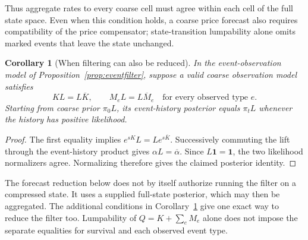 \documentclass[11pt]{article}
\theoremstyle{plain}
\newtheorem{corollary}[theorem]{Corollary}
\theoremstyle{definition}
\theoremstyle{remark}
\begin{document}
Thus aggregate rates to every coarse cell must agree within each
cell of the full state space. Even when this condition holds, a
coarse price forecast also requires compatibility of the price
compensator; state-transition lumpability alone omits marked events
that leave the state unchanged.

\begin{corollary}[When filtering can also be reduced]
\label{cor:filterreduction}
In the event-observation model of Proposition~\ref{prop:eventfilter},
suppose a valid coarse observation model satisfies
\[
 KL=L\overline K,\qquad M_eL=L\overline M_e
 \quad\text{for every observed type }e.
\]
Starting from coarse prior \(\pi_0L\), its event-history posterior
equals \(\pi_tL\) whenever the history has positive likelihood.
\end{corollary}
\begin{proof}
The first equality implies \(e^{sK}L=Le^{s\overline K}\).
Successively commuting the lift through the event-history product
gives \(\alpha L=\overline\alpha\). Since
\(L\mathbf1=\mathbf1\), the two likelihood normalizers agree.
Normalizing therefore gives the claimed posterior identity.
\end{proof}

The forecast reduction below does not by itself authorize running
the filter on a compressed state. It uses a supplied full-state
posterior, which may then be aggregated. The additional conditions in
Corollary~\ref{cor:filterreduction} give one exact way to reduce the
filter too. Lumpability of \(Q=K+\sum_eM_e\) alone does not impose
the separate equalities for survival and each observed event type.
\end{document}
